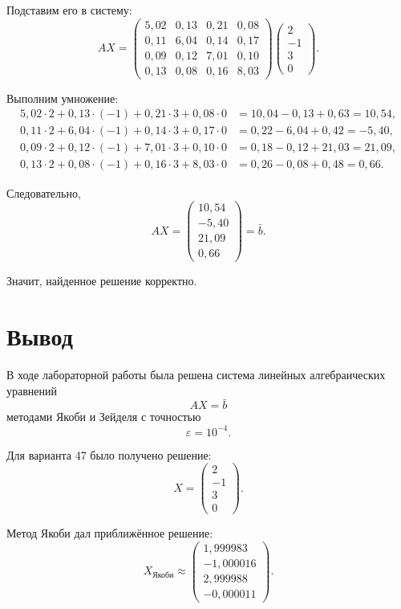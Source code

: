 Подставим его в систему:
\[
AX=
\begin{pmatrix}
5{,}02 & 0{,}13 & 0{,}21 & 0{,}08\\
0{,}11 & 6{,}04 & 0{,}14 & 0{,}17\\
0{,}09 & 0{,}12 & 7{,}01 & 0{,}10\\
0{,}13 & 0{,}08 & 0{,}16 & 8{,}03
\end{pmatrix}
\begin{pmatrix}
2\\
-1\\
3\\
0
\end{pmatrix}.
\]

Выполним умножение:
\[
\begin{aligned}
5{,}02\cdot2+0{,}13\cdot(-1)+0{,}21\cdot3+0{,}08\cdot0
&=10{,}04-0{,}13+0{,}63=10{,}54,\\
0{,}11\cdot2+6{,}04\cdot(-1)+0{,}14\cdot3+0{,}17\cdot0
&=0{,}22-6{,}04+0{,}42=-5{,}40,\\
0{,}09\cdot2+0{,}12\cdot(-1)+7{,}01\cdot3+0{,}10\cdot0
&=0{,}18-0{,}12+21{,}03=21{,}09,\\
0{,}13\cdot2+0{,}08\cdot(-1)+0{,}16\cdot3+8{,}03\cdot0
&=0{,}26-0{,}08+0{,}48=0{,}66.
\end{aligned}
\]

Следовательно,
\[
AX=
\begin{pmatrix}
10{,}54\\
-5{,}40\\
21{,}09\\
0{,}66
\end{pmatrix}
=
\bar b.
\]

Значит, найденное решение корректно.

\section{Вывод}

В ходе лабораторной работы была решена система линейных алгебраических уравнений
\[
AX=\bar b
\]
методами Якоби и Зейделя с точностью
\[
\varepsilon=10^{-4}.
\]

Для варианта 47 было получено решение:
\[
X=
\begin{pmatrix}
2\\
-1\\
3\\
0
\end{pmatrix}.
\]

Метод Якоби дал приближённое решение:
\[
X_{\text{Якоби}}
\approx
\begin{pmatrix}
1{,}999983\\
-1{,}000016\\
2{,}999988\\
-0{,}000011
\end{pmatrix}.
\]

